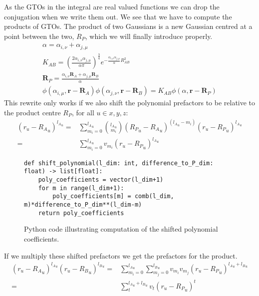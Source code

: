 As the GTOs in the integral are real valued functions we can drop the conjugation when we write them out.
We see that we have to compute the products of GTOs. The product of two Gaussians is a new Gaussian centred at a point between the two, $R_P$, which we will finally introduce properly.
\begin{gather}
    \alpha = \alpha_{i,\nu}+\alpha_{j,\mu}\\
    K_{AB} = \left(\frac{2\alpha_{i,\nu}\alpha_{j,\mu}}{\alpha\pi}\right)^\frac{3}{4}e^{-\frac{\alpha_{i,\nu}\alpha_{j,\mu}}{\alpha}R_{AB}^2}\\
    \pmb R_P = \frac{\alpha_{i,\nu}\pmb R_A+\alpha_{j,\mu}\pmb R_B}{\alpha}\\
    \phi(\alpha_{i,\mu},\pmb r-\pmb R_A)\phi(\alpha_{j,\nu},\pmb r-\pmb R_B) = K_{AB}\phi(\alpha,\pmb r-\pmb R_P)
\end{gather}
This rewrite only works if we also shift the polynomial prefactors to be relative to the product centre $R_P$, for all $u\in x,y,z$:
\begin{equation}
\begin{split}
    (r_u-{R_A}_u)^{{l_A}_u} = &\sum_{m_i=0}^{{l_A}_u}\binom{{l_A}_u}{m_i}({R_P}_u-{R_A}_u)^{({l_A}_u-m_i)}(r_u-{R_P}_u)^{{l_A}_u}\\
    =&\sum_{m_i=0}^{{l_A}_u}v_{m_i}(r_u-{R_P}_u)^{{l_A}_u}
\end{split}
\end{equation}
\begin{figure}[H]
\begin{verbatim}
def shift_polynomial(l_dim: int, difference_to_P_dim: float) -> list[float]:
    poly_coefficients = vector(l_dim+1)
    for m in range(l_dim+1):
        poly_coefficients[m] = comb(l_dim, m)*difference_to_P_dim**(l_dim-m)
    return poly_coefficients
\end{verbatim}
    \caption{Python code illustrating computation of the shifted polynomial coefficients.}
\end{figure}
If we multiply these shifted prefactors we get the prefactors for the product. 
\begin{equation}
\begin{split}
    (r_u-{R_A}_u)^{{l_A}_u}(r_u-{R_B}_u)^{{l_B}_u} = &\sum_{m_i=0}^{{l_A}_u}\sum_{m_j=0}^{{l_B}_u}v_{m_i}v_{m_j}(r_u-{R_P}_u)^{{l_A}_u+{l_B}_u}\\
    =&\sum_t^{{l_A}_u+{l_B}_u}v_t(r_u-{R_P}_u)^t
\end{split}
\end{equation}

